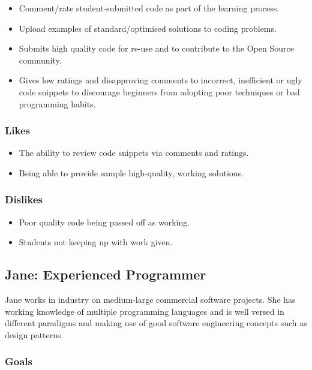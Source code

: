 \documentclass{sig-alt-release2}
\begin{document}
\begin{itemize}
\item Comment/rate student-submitted code as part of the learning process.
\item Upload examples of standard/optimised solutions to coding problems.
\item Submits high quality code for re-use and to contribute to the Open
Source community.
\item Gives low ratings and disapproving comments to incorrect,
inefficient or ugly code snippets to discourage beginners from
adopting poor techniques or bad programming habits.
\end{itemize}

\subsubsection{Likes}

\begin{itemize}
\item The ability to review code snippets via comments and ratings.
\item Being able to provide sample high-quality, working solutions.
\end{itemize}

\subsubsection{Dislikes}

\begin{itemize}
\item Poor quality code being passed off as working.
\item Students not keeping up with work given.
\end{itemize}

\subsection{Jane: Experienced Programmer}

Jane works in industry on medium-large commercial software projects. She has 
working knowledge of multiple programming languages and is well versed in 
different paradigms and making use of good software engineering concepts such as 
design patterns.

\subsubsection{Goals}
\end{document}
